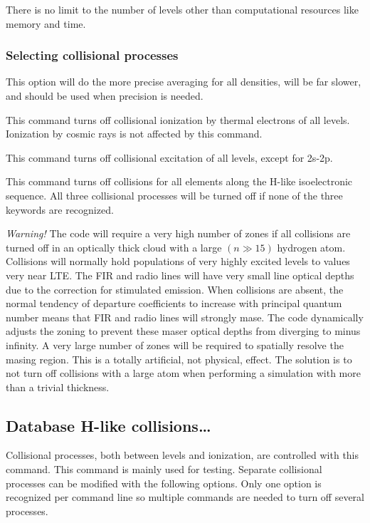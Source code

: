 There is no limit to the number of levels other than computational resources
like memory and time.

\subsubsection{Selecting  collisional processes}


 This option will do the more
precise averaging for all densities, will
be far slower, and should be used when precision is needed. 

This command turns off collisional
ionization by thermal electrons of all levels.
Ionization by
cosmic rays is not affected by this command.

This command turns off collisional
excitation of all levels, except for 2s-2p.

This command turns off collisions for all elements along the H-like
isoelectronic sequence.
All three collisional processes will be turned
off if none of the three keywords are recognized.

\emph{Warning!}  The code will require a very high number of zones
if all collisions
are turned off in an optically thick cloud with a large
$(n \gg 15)$ hydrogen atom.
Collisions will normally hold populations of very highly excited
levels to values very near LTE.
The FIR and radio lines will have very
small line optical depths due to the correction for stimulated emission.
When collisions are absent, the normal tendency of departure coefficients
to increase with principal quantum number means that FIR and radio lines
will strongly mase.
The code dynamically adjusts the zoning to prevent
these maser optical depths from diverging to minus infinity.
A very large
number of zones will be required to spatially resolve the masing region.
This is a totally artificial, not physical, effect.
The solution is to
not turn off collisions with a large atom when performing a
simulation with more than a trivial thickness.


\subsection{Database H-like collisions\dots }
\label{sec:datahlike}

Collisional processes, both between levels and ionization, are controlled
with this command.   This command is mainly
used for testing.  Separate collisional processes can be modified with
the following options.  Only one option is recognized per command line so
multiple commands are needed to turn off several processes.  

